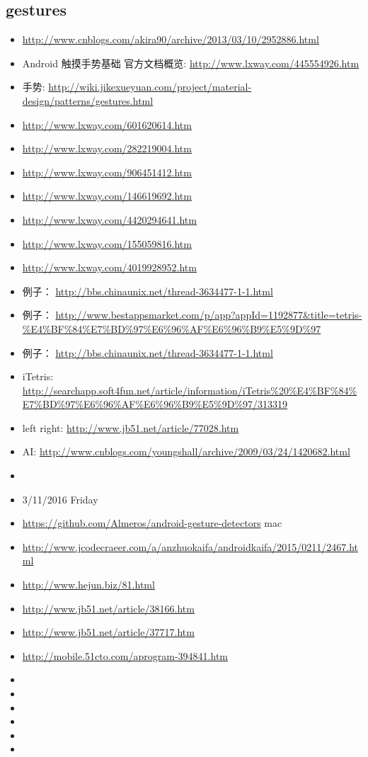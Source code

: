 \documentclass[9pt,b5paper]{article}
\begin{document}
\subsection{gestures}
\label{sec-4-2}
\begin{itemize}
\item \url{http://www.cnblogs.com/akira90/archive/2013/03/10/2952886.html}
\item Android 触摸手势基础 官方文档概览: \url{http://www.lxway.com/445554926.htm}
\item 手势: \url{http://wiki.jikexueyuan.com/project/material-design/patterns/gestures.html}
\item \url{http://www.lxway.com/601620614.htm}
\item \url{http://www.lxway.com/282219004.htm}
\item \url{http://www.lxway.com/906451412.htm}
\item \url{http://www.lxway.com/146619692.htm}
\item \url{http://www.lxway.com/4420294641.htm}
\item \url{http://www.lxway.com/155059816.htm}
\item \url{http://www.lxway.com/4019928952.htm}
\item 例子： \url{http://bbs.chinaunix.net/thread-3634477-1-1.html}
\item 例子： \url{http://www.bestappsmarket.com/p/app?appId=1192877&title=tetris-\%E4\%BF\%84\%E7\%BD\%97\%E6\%96\%AF\%E6\%96\%B9\%E5\%9D\%97}
\item 例子： \url{http://bbs.chinaunix.net/thread-3634477-1-1.html}

\item iTetris: \url{http://searchapp.soft4fun.net/article/information/iTetris\%20\%E4\%BF\%84\%E7\%BD\%97\%E6\%96\%AF\%E6\%96\%B9\%E5\%9D\%97/313319}
\item left right: \url{http://www.jb51.net/article/77028.htm}
\item AI: \url{http://www.cnblogs.com/youngshall/archive/2009/03/24/1420682.html}
\item 
\item 3/11/2016 Friday
\item \url{https://github.com/Almeros/android-gesture-detectors} mac
\item \url{http://www.jcodecraeer.com/a/anzhuokaifa/androidkaifa/2015/0211/2467.html}
\item \url{http://www.hejun.biz/81.html}
\item \url{http://www.jb51.net/article/38166.htm}
\item \url{http://www.jb51.net/article/37717.htm}
\item \url{http://mobile.51cto.com/aprogram-394841.htm}
\item 
\item 
\item 
\item 
\item 
\item 
\end{itemize}
\end{document}
